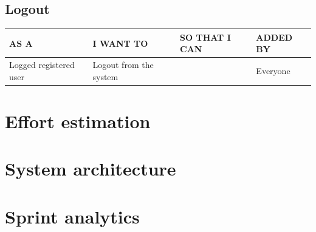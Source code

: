 \documentclass[11pt, a4paper]{article}
\begin{document}
\subsection{Logout}
\begin{table}[h!]
    \centering
    \begin{tabular}{|p{4.5cm}|p{4cm}|p{4cm}|p{4cm}|}
    \hline
    \rowcolor[HTML]{EFEFEF} 
    AS A                   & I WANT TO              & SO THAT I CAN & ADDED BY \\ \hline
    Logged registered user & Logout from the system &               & Everyone \\ \hline
    \end{tabular}
\end{table}


\newpage

\section{Effort estimation}


\newpage

\section{System architecture}


\newpage

\section{Sprint analytics}
\end{document}
